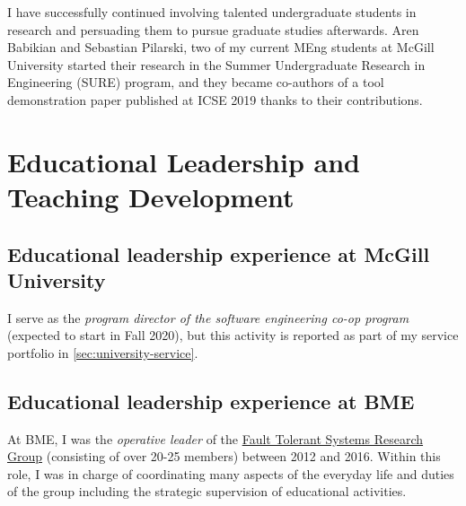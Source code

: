 I have successfully continued involving talented undergraduate students in research and persuading them to pursue 
graduate studies afterwards. Aren Babikian and Sebastian Pilarski, two of my current MEng students at McGill University 
started their research in the Summer Undergraduate Research in Engineering (SURE) program, and they became co-authors 
of a tool demonstration paper \cite{icse2019-tool} published at ICSE 2019 thanks to their contributions. 




\section{Educational Leadership and Teaching Development}



\subsection{Educational leadership experience at McGill University}
I serve as the \emph{program director of the software engineering co-op program} (expected to start in Fall 2020), but this activity is reported as part of my service portfolio in \autoref{sec:university-service}.
 

\subsection{Educational leadership experience at BME}
At BME, I was the \emph{operative leader} of the \href{http://inf.mit.bme.hu/en/}{Fault Tolerant Systems Research Group} (consisting of over 20-25 members) between 2012 and 2016. Within this role, I was in charge of coordinating many aspects of the everyday life and duties of the group including the strategic supervision of educational activities. 

